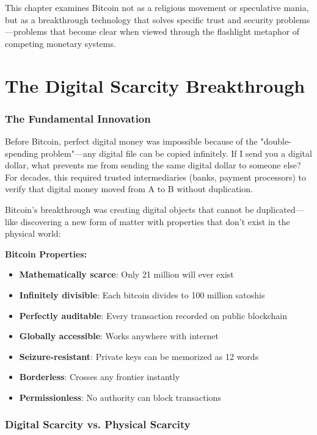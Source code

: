 \documentclass[11pt,oneside]{book}
\begin{document}
This chapter examines Bitcoin not as a religious movement or speculative mania, but as a breakthrough technology that solves specific trust and security problems—problems that become clear when viewed through the flashlight metaphor of competing monetary systems.

\section{The Digital Scarcity Breakthrough}

\subsubsection{The Fundamental Innovation}

Before Bitcoin, perfect digital money was impossible because of the "double-spending problem"—any digital file can be copied infinitely. If I send you a digital dollar, what prevents me from sending the same digital dollar to someone else? For decades, this required trusted intermediaries (banks, payment processors) to verify that digital money moved from A to B without duplication.

Bitcoin's breakthrough was creating digital objects that cannot be duplicated—like discovering a new form of matter with properties that don't exist in the physical world:

\textbf{Bitcoin Properties:}
\begin{itemize}
\item \textbf{Mathematically scarce}: Only 21 million will ever exist
\item \textbf{Infinitely divisible}: Each bitcoin divides to 100 million satoshis
\item \textbf{Perfectly auditable}: Every transaction recorded on public blockchain
\item \textbf{Globally accessible}: Works anywhere with internet
\item \textbf{Seizure-resistant}: Private keys can be memorized as 12 words
\item \textbf{Borderless}: Crosses any frontier instantly
\item \textbf{Permissionless}: No authority can block transactions
\end{itemize}

\subsubsection{Digital Scarcity vs. Physical Scarcity}
\end{document}

